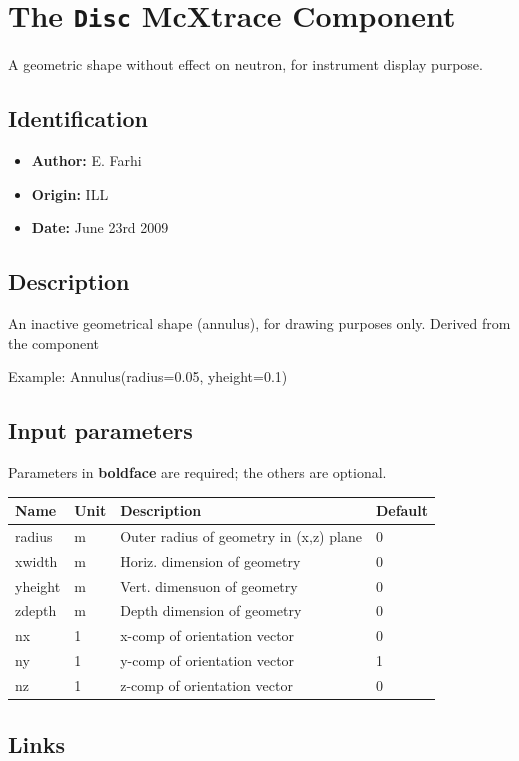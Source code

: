 \section{The \texttt{Disc} McXtrace Component}
A geometric shape without effect on neutron, for instrument display purpose.

\subsection*{Identification}
\begin{itemize}
  \item \textbf{Author:} E. Farhi
  \item \textbf{Origin:} ILL
  \item \textbf{Date:} June 23rd 2009
\end{itemize}

\subsection*{Description}
An inactive geometrical shape (annulus), for drawing purposes only. Derived from the \textbf{} component

Example: Annulus(radius=0.05, yheight=0.1)

\subsection*{Input parameters}
Parameters in \textbf{boldface} are required; the others are optional.

\begin{longtable}{p{}p{}p{}p{}}
\toprule
\textbf{Name} & \textbf{Unit} & \textbf{Description} & \textbf{Default} \\
\midrule
\endhead
radius & m & Outer radius of geometry in (x,z) plane & 0 \\
xwidth & m & Horiz. dimension of geometry & 0 \\
yheight & m & Vert. dimensuon of geometry & 0 \\
zdepth & m & Depth dimension of geometry & 0 \\
nx & 1 & x-comp of orientation vector & 0 \\
ny & 1 & y-comp of orientation vector & 1 \\
nz & 1 & z-comp of orientation vector & 0 \\
\bottomrule
\end{longtable}

\subsection*{Links}
\begin{itemize}
  \item Component source code found in file \texttt{Disc.comp}.
  \item mcdoc page of } component
\end{itemize}
